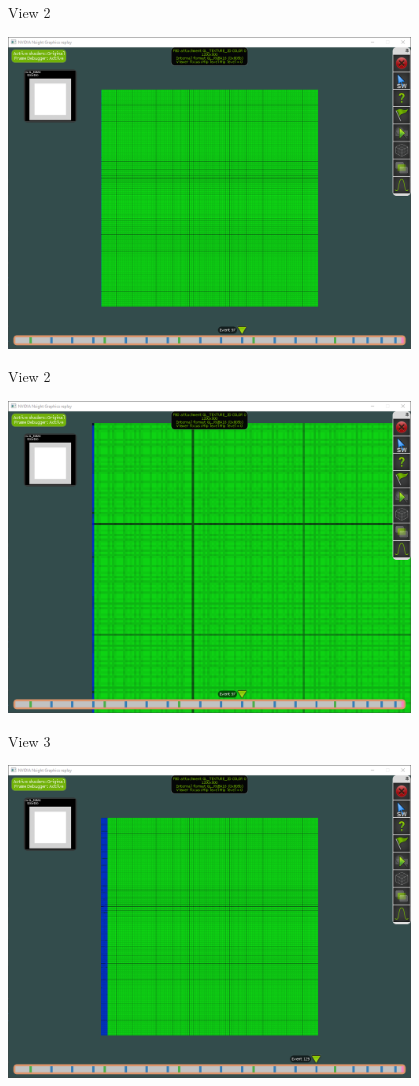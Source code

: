\documentclass{../presentation}
\begin{document}
\begin{frame}{View 2}
    \begin{center}
        \includegraphics[width=0.8\textwidth]{visualizer_2_full.png}
    \end{center}
\end{frame}

\begin{frame}{View 2}
    \begin{center}
        \includegraphics[width=0.8\textwidth]{visualizer_2_zoom.png}
    \end{center}
\end{frame}

\begin{frame}{View 3}
    \begin{center}
        \includegraphics[width=0.8\textwidth]{visualizer_3_full.png}
    \end{center}
\end{frame}
\end{document}
